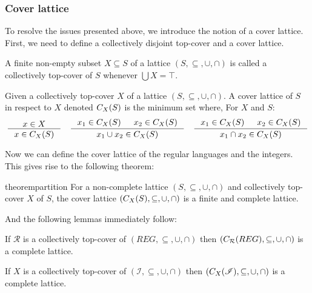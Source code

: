 \subsubsection{Cover lattice}
To resolve the issues presented above, we introduce the notion of a cover lattice.
First, we need to define a collectively disjoint top-cover and a cover lattice.

\begin{definition}
    A finite non-empty subset $X \subseteq S$ of a lattice $(S, \subseteq, \cup, \cap)$ is called a collectively top-cover of $S$ whenever $\bigcup X = \top$.
\end{definition}

\begin{definition}\label{def:coverlattice}
Given a collectively top-cover $X$ of a lattice $(S, \subseteq, \cup, \cap)$.
A cover lattice of $S$ in respect to $X$ denoted $C_{X}(S)$ is the minimum set where,
For $X$ and $S$:
\begin{align}
    \inference{x \in X}{x \in C_X(S)} \quad
    \inference{x_1 \in C_X(S) & x_2 \in C_X(S)}{x_1 \cup  x_2 \in C_X(S)} \quad
    \inference{x_1 \in C_X(S) & x_2 \in C_X(S)}{x_1 \cap  x_2 \in C_X(S)}
\end{align}
\end{definition}

Now we can define the cover lattice of the regular languages and the integers.
This gives rise to the following theorem:

\begin{restatable}{theorem}{partition}\label{thm:partition}
For a non-complete lattice $(S, \subseteq, \cup, \cap)$ and collectively top-cover $X$ of $S$, the cover lattice $(C_{X}(S), \subseteq, \cup, \cap)$ is a finite and complete lattice.
\end{restatable}

And the following lemmas immediately follow:

\begin{lemma}
    If $\mathcal{R}$ is a collectively top-cover of $(REG, \subseteq, \cup, \cap)$ then $(C_{\mathcal{R}}(REG), \subseteq, \cup, \cap)$ is a complete lattice.
\end{lemma}

\begin{lemma}
    If $X$ is a collectively top-cover of $(\mathscr{I}, \subseteq, \cup, \cap)$ then $(C_{X}(\mathscr{I}), \subseteq, \cup, \cap)$ is a complete lattice.
\end{lemma}

